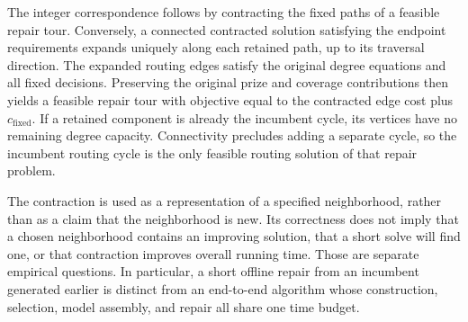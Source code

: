 The integer correspondence follows by contracting the fixed paths of a feasible
repair tour. Conversely, a connected contracted solution satisfying the endpoint
requirements expands uniquely along each retained path, up to its traversal
direction. The expanded routing edges satisfy the original degree equations and
all fixed decisions. Preserving the original prize and coverage contributions
then yields a feasible repair tour with objective equal to the contracted edge
cost plus $c_{\mathrm{fixed}}$. If a retained component is already the incumbent
cycle, its vertices have no remaining degree capacity. Connectivity precludes
adding a separate cycle, so the incumbent routing cycle is the only feasible
routing solution of that repair problem.

The contraction is used as a representation of a specified neighborhood, rather
than as a claim that the neighborhood is new. Its correctness does not imply
that a chosen neighborhood contains an improving solution, that a short solve
will find one, or that contraction improves overall running time. Those are
separate empirical questions. In particular, a short offline repair from an
incumbent generated earlier is distinct from an end-to-end algorithm whose
construction, selection, model assembly, and repair all share one time budget.
